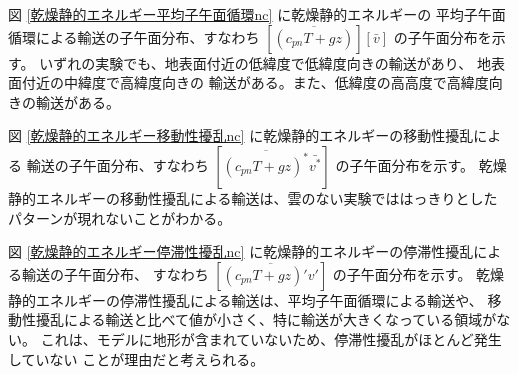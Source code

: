 \documentclass[body]{subfiles}
\begin{document}
\afterpage{\clearpage}

図 \ref{乾燥静的エネルギー平均子午面循環nc} に乾燥静的エネルギーの
平均子午面循環による輸送の子午面分布、すなわち 
\([\overline{(c_{pn}T+gz)}][\bar v]\) の子午面分布を示す。
いずれの実験でも、地表面付近の低緯度で低緯度向きの輸送があり、
地表面付近の中緯度で高緯度向きの
輸送がある。また、低緯度の高高度で高緯度向きの輸送がある。

図 \ref{乾燥静的エネルギー移動性擾乱nc} に乾燥静的エネルギーの移動性擾乱による
輸送の子午面分布、すなわち \([\overline{(c_{pn}T+gz)^*}\bar{v^*}]\) の子午面分布を示す。
乾燥静的エネルギーの移動性擾乱による輸送は、雲のない実験でははっきりとした
パターンが現れないことがわかる。

図 \ref{乾燥静的エネルギー停滞性擾乱nc} に乾燥静的エネルギーの停滞性擾乱による輸送の子午面分布、
すなわち \([\overline{(c_{pn}T+gz)'v'}]\) の子午面分布を示す。
乾燥静的エネルギーの停滞性擾乱による輸送は、平均子午面循環による輸送や、
移動性擾乱による輸送と比べて値が小さく、特に輸送が大きくなっている領域がない。
これは、モデルに地形が含まれていないため、停滞性擾乱がほとんど発生していない
ことが理由だと考えられる。
\end{document}
